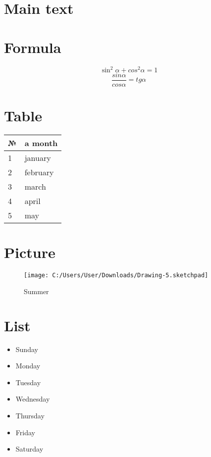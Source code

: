 \documentclass[10pt,a4paper]{article}
\begin{document}
	
	\section{Main text}
	\section{Formula}
	\begin{equation}\label{1}
		\sin^2\alpha+cos^2\alpha=1
	\end{equation}	
\begin{equation}\label{2}
	\frac{sin\alpha}{cos\alpha}=tg\alpha
\end{equation}


\section{Table}
\begin{tabular}{|l|l|}
\hline
\textbf{	№}&\textbf{a month}\\ \hline
	1&january\\ \hline
	2&february\\ \hline
	3&march\\ \hline
	4&april\\ \hline
	5&may\\ \hline
\end{tabular}
\section{Picture}
\begin{figure}
	\centering
	\texttt{[image: C:/Users/User/Downloads/Drawing-5.sketchpad]}
	\caption{Summer}
	\label{fig:drawing-5}
\end{figure}
\section{List}
\begin{itemize}
	\item Sunday
	\item Monday
	\item Tuesday
	\item Wednesday
	\item Thursday
    \item Friday
    \item Saturday
	
\end{itemize}







	
\end{document}
